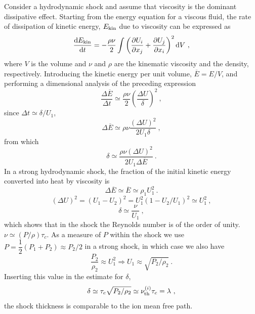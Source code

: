 \documentclass[12pt,a4paper]{article}
\newcommand{\dif}{\mathrm{d}}
\begin{document}
Consider a hydrodynamic shock and assume that viscosity is the dominant dissipative effect. Starting from the energy equation for a viscous fluid, the rate of dissipation of kinetic energy, $E_{\rm kin}$ due to viscosity can be expressed as
\begin{equation}
\dfrac{\dif E_{\rm kin} }{\dif t} = -\frac{\rho \nu}{2} \int \left(\dfrac{\partial U_i }{\partial x_j} +\dfrac{\partial U_j}{\partial x_i} \right)^2 \dif V ~,
\end{equation}
where $V$ is the volume and $\nu$ and $\rho$ are the kinematic viscosity and the density, respectively. Introducing the kinetic energy per unit volume, $\overline{E} = E/V$, and performing a dimensional analysis of the preceding expression 
\begin{equation*}
\dfrac{\Delta \overline{E} }{\Delta t} \simeq \dfrac{\rho \nu}{2} \left(\dfrac{\Delta U }{\delta } \right)^2 ~,
\end{equation*}
since $\Delta t \simeq \delta/U_1$,
\begin{equation}
\Delta \overline{E} \simeq \rho \nu \dfrac{(\Delta U)^2 }{2U_1\delta }  ~,
\end{equation}
from which
\begin{equation}
\delta \simeq \dfrac{\rho \nu (\Delta U)^2 }{2U_1 \Delta \overline{E} } ~.
\end{equation}
In a strong hydrodynamic shock, the fraction of the initial kinetic energy converted into heat by viscosity is
\begin{equation*}
\Delta \overline{E} \simeq \overline{E} \simeq \rho_1 U_1^2 ~.
\end{equation*}
\begin{equation*}
(\Delta U)^2 = (U_1-U_2)^2 = U_1^2(1-U_2/U_1)^2 \simeq U_1^2 ~,
\end{equation*}
\begin{equation*}
\delta \simeq  \dfrac{\nu}{U_1} ~,
\end{equation*}
which shows that in the shock the Reynolds number is of the order of unity. $\nu \simeq (P/\rho) \tau_c$. As a measure of $P$ within the shock we use $P = \dfrac{1}{2} (P_1 + P_2) \approx P_2/2$ in a strong shock,  in which case we also have
\begin{equation*}
\dfrac{P_2}{\rho_2}  \approx U_1^2 \Longrightarrow U_1 \approx \sqrt{P_2/\rho_2} ~.
\end{equation*}
Inserting this value in the estimate for $\delta$, 
\begin{equation*}
\delta \simeq \tau_c \sqrt{P_2/\rho_2} \simeq \nu_{\rm th}^{(i)} \tau_c = \lambda ~,
\end{equation*}
the shock thickness is comparable to the ion mean free path.
\end{document}
